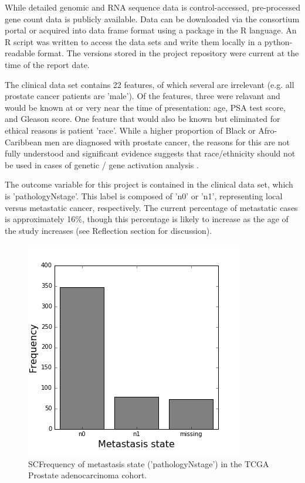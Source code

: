 \documentclass[final]{article}
\begin{document}
While detailed genomic and RNA sequence data is control-accessed, pre-processed
gene count data is publicly available.  Data can be downloaded via the
consortium  portal or acquired into data frame format using a package in the R
language.  An R script was written to access the data sets and write them locally
in a python-readable format.  The versions stored in the project repository were current at
the time of the report date.

The clinical data set contains 22 features, of which several are irrelevant
(e.g. all prostate cancer patients are 'male').  Of the features, three were relavant and would be
known at or very near the time of presentation: age, PSA test score, and Gleason
score.  One feature that would also be known but eliminated for ethical reasons is
patient 'race'.  While a higher proportion of Black or Afro-Caribbean men are
diagnosed with prostate cancer, the reasons for this are not fully understood \cite{Shea08} and significant evidence suggests that
race/ethnicity should not be used in cases of genetic / gene activation analysis \cite{Yudel16}.

The outcome variable for this project is contained in the clinical data set,
which is 'pathologyNstage'.  This label is composed of 'n0' or 'n1',
representing local versus metastatic cancer, respectively.  The current
percentage of metastatic cases is approximately 16\%, though this percentage is
likely to increase as the age of the study increases (see Reflection section for
discussion).

\begin{figure}
	\centering
	\includegraphics[scale=0.5]{LabelCount}
  \caption{SCFrequency of metastasis state ('pathologyNstage') in the TCGA Prostate adenocarcinoma cohort.\label{MetFreq}}
\end{figure}
\end{document}
